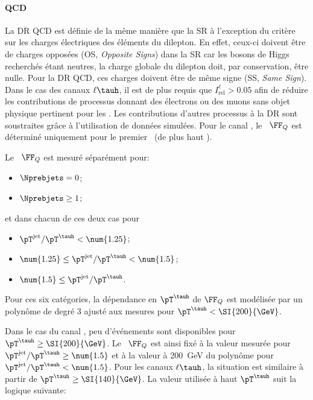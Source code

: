 \paragraph{QCD}
La DR QCD est définie de la même manière que la SR à l'exception du critère sur les charges électriques des éléments du dilepton.
En effet, ceux-ci doivent être de charges opposées (OS, \emph{Opposite Signs}) dans la SR car les bosons de Higgs recherchés étant neutres, la charge globale du dilepton doit, par conservation, être nulle.
Pour la DR QCD, ces charges doivent être de même signe (SS, \emph{Same Sign}).
Dans le cas des canaux $\ell\tauh$, il est de plus requis que $I_\text{rel}^{\ell} > \num{0.05}$ afin de réduire les contributions de processus donnant des électrons ou des muons sans objet physique pertinent pour les \fakefactors.
Les contributions d'autres processus à la DR sont soustraites grâce à l'utilisation de données simulées.
Pour le canal \tauh\tauh, le \fakefactor\ $\FF_Q$ est déterminé uniquement pour le premier \tauh\ (de plus haut \pT).
\par
Le \fakefactor\ $\FF_Q$ est mesuré séparément pour:
\begin{itemize}
\item $\Nprebjets=0$;
\item $\Nprebjets\geq1$;
\end{itemize}
et dans chacun de ces deux cas pour
\begin{itemize}
\item $\pT^\text{jet}/\pT^{\tauh} < \num{1.25}$;
\item $\num{1.25} \leq \pT^\text{jet}/\pT^{\tauh} < \num{1.5}$;
\item $\num{1.5} \leq \pT^\text{jet}/\pT^{\tauh}$.
\end{itemize}
Pour ces six catégories, la dépendance en $\pT^{\tauh}$ de $\FF_Q$ est modélisée par un polynôme de degré 3 ajusté aux mesures pour $\pT^{\tauh}<\SI{200}{\GeV}$.
\par
Dans le cas du canal \tauh\tauh, peu d'événements sont disponibles pour $\pT^{\tauh}\geq\SI{200}{\GeV}$.
Le \fakefactor\ $\FF_Q$ est ainsi fixé à la valeur mesurée pour $\pT^\text{jet}/\pT^{\tauh} \geq \num{1.5}$ et à la valeur à \SI{200}{\GeV} du polynôme pour $\pT^\text{jet}/\pT^{\tauh} < \num{1.5}$.
Pour les canaux $\ell\tauh$, la situation est similaire à partir de $\pT^{\tauh}\geq\SI{140}{\GeV}$.
La valeur utilisée à haut $\pT^{\tauh}$ suit la logique suivante:
